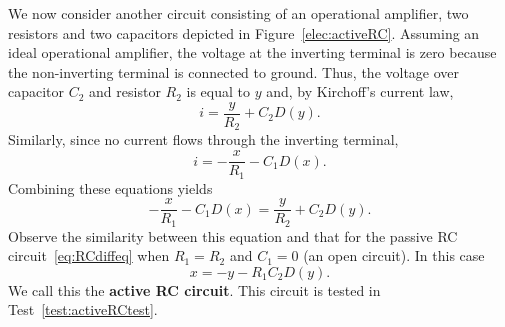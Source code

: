 \documentclass[11pt,a4paper]{book}
\theoremstyle{plain}
\numberwithin{equation}{section}
\newcommand{\term}{\textbf}
\newcounter{test}
\begin{document}
We now consider another circuit consisting of an operational amplifier, two resistors and two capacitors depicted in Figure~\ref{elec:activeRC}.  Assuming an ideal operational amplifier, the voltage at the inverting terminal is zero because the non-inverting terminal is connected to ground.  Thus, the voltage over capacitor $C_2$ and resistor $R_2$ is equal to $y$ and, by Kirchoff's current law,
\[
i = \frac{y}{R_2} + C_2 D(y).
\]
Similarly, since no current flows through the inverting terminal,
\[
i = -\frac{x}{R_1} - C_1 D(x).
\]
Combining these equations yields
\begin{equation}\label{eq:twoaparrarrelRCactive}
-\frac{x}{R_1} - C_1 D(x) = \frac{y}{R_2} + C_2 D(y).
\end{equation}
Observe the similarity between this equation and that for the passive RC circuit~\eqref{eq:RCdiffeq} when $R_1 = R_2$ and $C_1 = 0$ (an open circuit).  In this case
\begin{equation}\label{eq:activeRC}
x = - y - R_1 C_2 D(y).
\end{equation}
We call this the \term{active RC circuit}.  This circuit is tested in Test~\ref{test:activeRCtest}.

\end{document}
